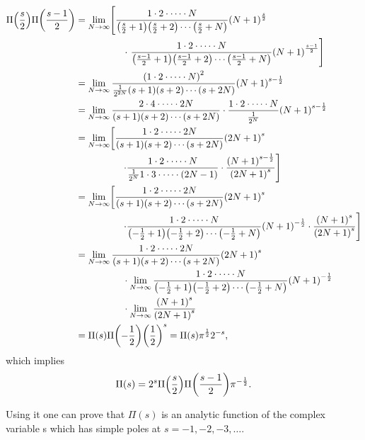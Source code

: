 \documentclass{note}
\numberwithin{equation}{chapter}
\newcommand{\piprod}[2]{
    \frac{1\cdot2\cdot\cdots\cdot #2}{\prn{#1+1}\prn{#1+2}\cdots\prn{#1+#2}}
    \prn{#2+1}^{#1}
}
\begin{document}
\begin{align*}
    \Pi\prn{\frac{s}{2}}\Pi\prn{\frac{s-1}{2}}
     & = \lim_{N\rightarrow\infty} \left[ \piprod{\frac{s}{2}}{N} \right.             \\
     & \hspace{5em} \cdot \left. \piprod{\frac{s-1}{2}}{N} \right]                    \\
     & = \lim_{N\rightarrow\infty} \frac{\prn{1\cdot2\cdot\cdots\cdot N}^2}
    {\frac{1}{2^{2N}}\prn{s+1}\prn{s+2}\cdots\prn{s+2N}}\prn{N+1}^{s-\frac12}         \\
     & = \lim_{N\rightarrow\infty} \frac{2\cdot4\cdot\cdots\cdot 2N}{\prn{s+1}
        \prn{s+2}\cdots\prn{s+2N}} \cdot \frac{1\cdot2\cdot\cdots\cdot N}
    {\frac{1}{2^{N}}}\prn{N+1}^{s-\frac12}                                            \\
     & = \lim_{N\rightarrow\infty} \left[ \piprod{s}{2N} \right.                      \\
     & \hspace{5em} \left. \cdot \frac{1\cdot2\cdot\cdots\cdot N}{\frac{1}{2^{N}}
            1\cdot3\cdot\cdots\cdot (2N-1)} \cdot \frac{\prn{N+1}^{s-\frac12}}
    {\prn{2N+1}^s} \right]                                                            \\
     & = \lim_{N\rightarrow\infty} \left[ \piprod{s}{2N} \right.                      \\
     & \hspace{5em} \left. \cdot \piprod{-\frac12}{N} \cdot \frac{\prn{N+1}^{s}}
    {\prn{2N+1}^s} \right]                                                            \\
     & = \lim_{N\rightarrow\infty} \piprod{s}{2N}                                     \\
     & \hspace{5em} \cdot \lim_{N\rightarrow\infty} \piprod{-\frac12}{N}              \\
     & \hspace{5em} \cdot \lim_{N\rightarrow\infty}\frac{\prn{N+1}^{s}}{\prn{2N+1}^s} \\
     & = \Pi\prn{s} \Pi\prn{-\frac12} \prn{\frac12}^s = \Pi\prn{s} \pi^{\frac12}
    2^{-s},
\end{align*}
which implies
\begin{equation*}
    \Pi\prn{s} = 2^{s} \Pi\prn{\frac{s}{2}} \Pi\prn{\frac{s-1}{2}} \pi^{-\frac12}.
\end{equation*}

\begin{quotebar}
    Using it one can prove that $\Pi(s)$ is an analytic function of the complex
    variable s which has simple poles at $s = -1, -2, -3, \dots$.
\end{quotebar}
\end{document}

